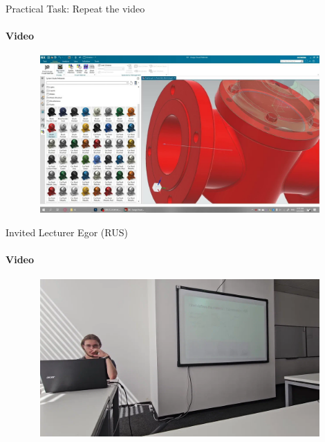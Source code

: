\documentclass[aspectratio=169]{beamer}
\newcommand{\fbckg}[1]{\usebackgroundtemplate{\texttt{[image: \#1]}}}%
\begin{document}
\begin{frame}[t]{Practical Task: Repeat the video}
    \framesubtitle{Video}
    \vspace{-0.6cm}
    \begin{figure}[H]
        \href{https://disk.yandex.ru/i/aXWXryrDGGdZ0A}{
            \centering\includegraphics[height=6cm,width=1\textwidth,keepaspectratio]{practice_render.jpg}}
        \label{fig:practice_render.jpg}
    \end{figure}
\end{frame}

\begin{frame}[t]{Invited Lecturer Egor (RUS)}
    \framesubtitle{Video}
    \vspace{-0.6cm}
    \begin{figure}[H]
        \href{https://disk.yandex.ru/i/g4k_bOkkXyebJA}{
            \centering\includegraphics[height=6cm,width=1\textwidth,keepaspectratio]{egor_render_video.png}}
        \label{fig:egor_render_video.png}
    \end{figure}
\end{frame}

    

\fbckg{fibeamer/figs/last_page.png}
\frame[plain]{}
\end{document}
